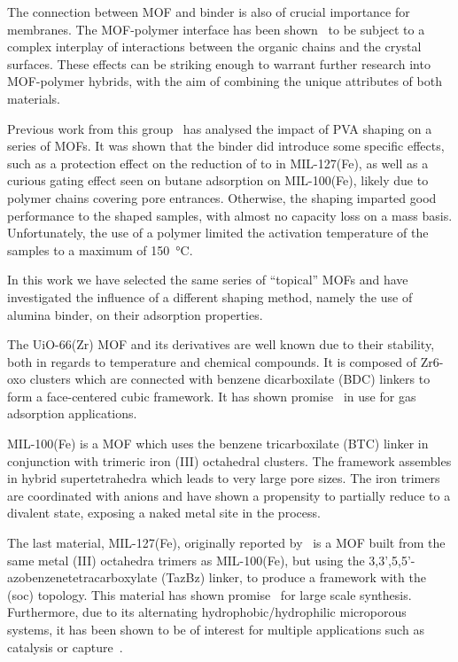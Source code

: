 The connection between MOF and binder is also of crucial importance for membranes. 
The MOF-polymer interface has been shown~\cite{seminoMicroscopicModelMetal2016} to be 
subject to a complex interplay of interactions between the organic chains and the 
crystal surfaces. These effects can be striking enough to warrant further research
into MOF-polymer hybrids\cite{kitaoHybridizationMOFsPolymers2017}, with the aim of
combining the unique attributes of both materials.

Previous work from this group~\cite{chanutObservingEffectsShaping2016} has analysed the impact 
of PVA shaping on a series of MOFs. It was shown that the binder did introduce 
some specific effects, such as a protection effect on the reduction of  to 
 in MIL-127(Fe), as well as a curious gating effect seen on butane adsorption
on MIL-100(Fe), likely due to polymer chains covering pore entrances. Otherwise, the 
shaping imparted good performance to the shaped samples, with almost no capacity loss on 
a mass basis. Unfortunately, the use of a polymer limited the activation temperature of the 
samples to a maximum of \SI{150}{\degreeCelsius}.

In this work we have selected the same series of ``topical'' MOFs and have investigated the
influence of a different shaping method, namely the use of alumina binder, on their adsorption 
properties.

The UiO-66(Zr) MOF and its derivatives are well known due to their stability, both in regards to
temperature and chemical compounds\cite{cavkaNewZirconiumInorganic2008}. It is composed of
Zr6-oxo clusters which are connected with benzene dicarboxilate (BDC) linkers to form
a face-centered cubic framework. It has shown promise~\cite{wiersumEvaluationUiO66GasBased2011}
in use for gas adsorption applications.

MIL-100(Fe) is a MOF which uses the benzene tricarboxilate (BTC) linker in conjunction
with trimeric iron (III) octahedral clusters.\cite{horcajadaSynthesisCatalyticProperties2007} 
The framework assembles in hybrid supertetrahedra which leads to very large pore sizes.
The iron trimers are coordinated with
anions and have shown a propensity to partially reduce to a divalent  state, exposing
a naked metal site in the process.\cite{yoonControlledReducibilityMetalOrganic2010}

The last material, MIL-127(Fe), originally reported by~\citeauthor{liuAssemblyMetalOrganic2007} is
a MOF built from the same metal (III) octahedra trimers as MIL-100(Fe), but using the 
3,3',5,5'-azobenzenetetracarboxylate (TazBz) linker, to produce a framework with the (soc) 
topology. This material has shown promise~\cite{chevreauSynthesisBiocompatibleHighly2016} 
for large scale synthesis. Furthermore, due to its alternating hydrophobic/hydrophilic 
microporous systems, it has been shown to be of interest for multiple applications such 
as catalysis or  capture~\cite{chanutScreeningEffectWater2017}.

